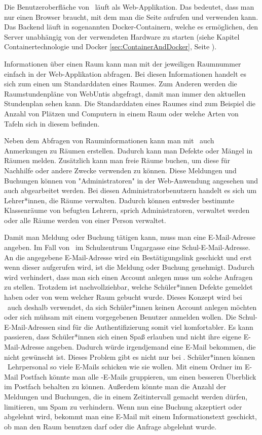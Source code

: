 Die Benutzeroberfläche von \ZELIA\ läuft als Web-Applikation. Das bedeutet, dass man nur einen Browser braucht, mit dem man die Seite aufrufen und verwenden kann. Das Backend läuft in sogenannten Docker-Containern, welche es ermöglichen, den Server unabhängig von der verwendeten Hardware zu starten (siehe Kapitel Containertechnologie und Docker \ref{sec:ContainerAndDocker}, Seite \pageref{sec:ContainerAndDocker}).

Informationen über einen Raum kann man mit der jeweiligen Raumnummer einfach in der Web-Applikation abfragen. Bei diesen Informationen handelt es sich zum einen um Standarddaten eines Raumes. Zum Anderen werden die Raumstundenpläne von WebUntis abgefragt, damit man immer den aktuellen Stundenplan sehen kann. Die Standarddaten eines Raumes sind zum Beispiel die Anzahl von Plätzen und Computern in einem Raum oder welche Arten von Tafeln sich in diesem befinden.

Neben dem Abfragen von Rauminformationen kann man mit \ZELIA\ auch Anmerkungen zu Räumen erstellen. Dadurch kann man Defekte oder Mängel in Räumen melden. Zusätzlich kann man freie Räume buchen, um diese für Nachhilfe oder andere Zwecke verwenden zu können. Diese Meldungen und Buchungen können von "Administratoren" in der Web-Anwendung angesehen und auch abgearbeitet werden. Bei diesen Administratorbenutzern handelt es sich um Lehrer*innen, die Räume verwalten. Dadurch können entweder bestimmte Klassenräume von befugten Lehrern, sprich Administratoren, verwaltet werden oder alle Räume werden von einer Person verwaltet.

Damit man Meldung oder Buchung tätigen kann, muss man eine E-Mail-Adresse angeben. Im Fall von \ZELIA\ im Schulzentrum Ungargasse eine Schul-E-Mail-Adresse. An die angegebene E-Mail-Adresse wird ein Bestätigungslink geschickt und erst wenn dieser aufgerufen wird, ist die Meldung oder Buchung genehmigt. Dadurch wird verhindert, dass man sich einen Account anlegen muss um solche Anfragen zu stellen. Trotzdem ist nachvollziehbar, welche Schüler*innen Defekte gemeldet haben oder von wem welcher Raum gebucht wurde. Dieses Konzept wird bei \ZELIA\ auch deshalb verwendet, da sich Schüler*innen keinen Account anlegen möchten oder sich mühsam mit einem vorgegebenen Benutzer anmelden wollen. Die Schul-E-Mail-Adressen sind für die Authentifizierung somit viel komfortabler. Es kann passieren, dass Schüler*innen sich einen Spaß erlauben und nicht ihre eigene E-Mail-Adresse angeben. Dadurch würde irgendjemand eine E-Mail bekommen, die nicht gewünscht ist. Dieses Problem gibt es nicht nur bei \ZELIA. Schüler*innen können \zb\ Lehrpersonal so viele E-Mails schicken wie sie wollen. Mit einem Ordner im E-Mail Postfach könnte man alle \ZELIA-E-Mails gruppieren, um einen besseren Überblick im Postfach behalten zu können. Außerdem könnte man die Anzahl der Meldungen und Buchungen, die in einem Zeitintervall gemacht werden dürfen, limitieren, um Spam zu verhindern. Wenn nun eine Buchung akzeptiert oder abgelehnt wird, bekommt man eine E-Mail mit einem Informationstext geschickt, ob man den Raum benutzen darf oder die Anfrage abgelehnt wurde.

